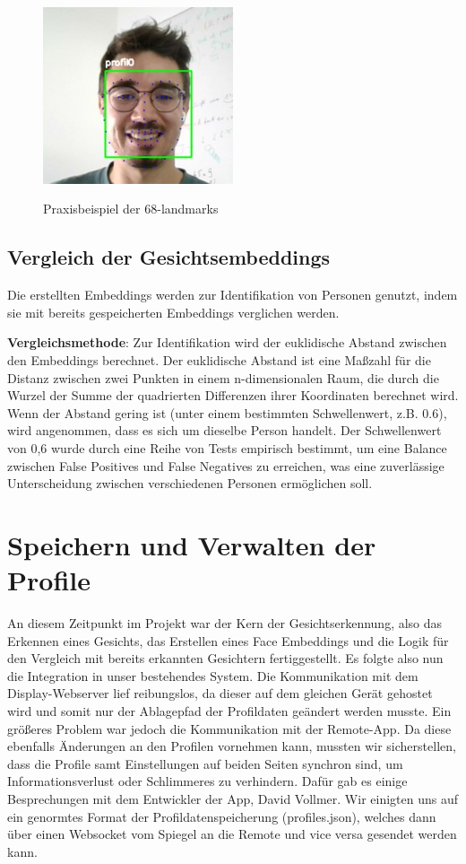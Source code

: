 \begin{figure}[h!]
    \centering
    \includegraphics[width=0.5\textwidth]{pictures/68landmarks.jpg}
    \caption{Praxisbeispiel der 68-landmarks}
    \label{fig:68landmarks}
    \cite{68landmarks}
\end{figure}

\subsection{Vergleich der Gesichtsembeddings}
Die erstellten Embeddings werden zur Identifikation von Personen genutzt, indem sie mit bereits gespeicherten Embeddings verglichen werden. 

\textbf{Vergleichsmethode}:
Zur Identifikation wird der euklidische Abstand zwischen den Embeddings berechnet. Der euklidische Abstand ist eine Maßzahl für die Distanz zwischen zwei Punkten in einem n-dimensionalen Raum, die durch die Wurzel der Summe der quadrierten Differenzen ihrer Koordinaten berechnet wird. Wenn der Abstand gering ist (unter einem bestimmten Schwellenwert, z.B. 0.6), wird angenommen, dass es sich um dieselbe Person handelt. Der Schwellenwert von 0,6 wurde durch eine Reihe von Tests empirisch bestimmt, um eine Balance zwischen False Positives und False Negatives zu erreichen, was eine zuverlässige Unterscheidung zwischen verschiedenen Personen ermöglichen soll.

\section{Speichern und Verwalten der Profile}

An diesem Zeitpunkt im Projekt war der Kern der Gesichtserkennung, also das Erkennen eines Gesichts, das Erstellen eines Face Embeddings und die Logik für den Vergleich mit bereits erkannten Gesichtern fertiggestellt. Es folgte also nun die Integration in unser bestehendes System. Die Kommunikation mit dem Display-Webserver lief reibungslos, da dieser auf dem gleichen Gerät gehostet wird und somit nur der Ablagepfad der Profildaten geändert werden musste. Ein größeres Problem war jedoch die Kommunikation mit der Remote-App. Da diese ebenfalls Änderungen an den Profilen vornehmen kann, mussten wir sicherstellen, dass die Profile samt Einstellungen auf beiden Seiten synchron sind, um Informationsverlust oder Schlimmeres zu verhindern. Dafür gab es einige Besprechungen mit dem Entwickler der App, David Vollmer. Wir einigten uns auf ein genormtes Format der Profildatenspeicherung (profiles.json), welches dann über einen Websocket vom Spiegel an die Remote und vice versa gesendet werden kann.
